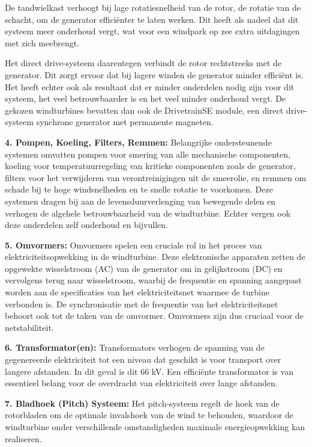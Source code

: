 De tandwielkast verhoogt bij lage rotatiesnelheid van de rotor, de rotatie van de schacht, om de generator efficiënter te laten werken. Dit heeft als nadeel dat dit systeem meer onderhoud vergt, wat voor een windpark op zee extra uitdagingen met zich meebrengt.

Het direct drive-systeem daarentegen verbindt de rotor rechtstreeks met de generator. Dit zorgt ervoor dat bij lagere winden de generator minder efficiënt is. Het heeft echter ook als resultaat dat er minder onderdelen nodig zijn voor dit systeem, het veel betrouwbaarder is en het veel minder onderhoud vergt. De gekozen windturbines bevatten dan ook de DrivetrainSE module, een direct drive-systeem synchrone generator met permanente magneten.\cite{NREL_turbine_documentatie}

\textbf{4. Pompen, Koeling, Filters, Remmen:}
Belangrijke ondersteunende systemen omvatten pompen voor smering van alle mechanische componenten, koeling voor temperatuurregeling van kritieke componenten zoals de generator, filters voor het verwijderen van verontreinigingen uit de smeerolie, en remmen om schade bij te hoge windsnelheden en te snelle rotatie te voorkomen. Deze systemen dragen bij aan de levensduurverlenging van bewegende delen en verhogen de algehele betrouwbaarheid van de windturbine. Echter vergen ook deze onderdelen zelf onderhoud en bijvullen.\cite{Eneco_presentatie}

\textbf{5. Omvormers:}
Omvormers spelen een cruciale rol in het proces van elektriciteitsopwekking in de windturbine. Deze elektronische apparaten zetten de opgewekte wisselstroom (AC) van de generator om in gelijkstroom (DC) en vervolgens terug naar wisselstroom, waarbij de frequentie en spanning aangepast worden aan de specificaties van het elektriciteitsnet waarmee de turbine verbonden is. De synchronisatie met de frequentie van het elektriciteitsnet behoort ook tot de taken van de omvormer. Omvormers zijn dus cruciaal voor de netstabiliteit.

\textbf{6. Transformator(en):}
Transformators verhogen de spanning van de gegenereerde elektriciteit tot een niveau dat geschikt is voor transport over langere afstanden. In dit geval is dit 66 kV. Een efficiënte transformator is van essentieel belang voor de overdracht van elektriciteit over lange afstanden.\cite{Huygens_Engineers_presentatie}

\textbf{7. Bladhoek (Pitch) Systeem:}
Het pitch-systeem regelt de hoek van de rotorbladen om de optimale invalshoek van de wind te behouden, waardoor de windturbine onder verschillende omstandigheden maximale energieopwekking kan realiseren.\cite{NREL_turbine_documentatie}

